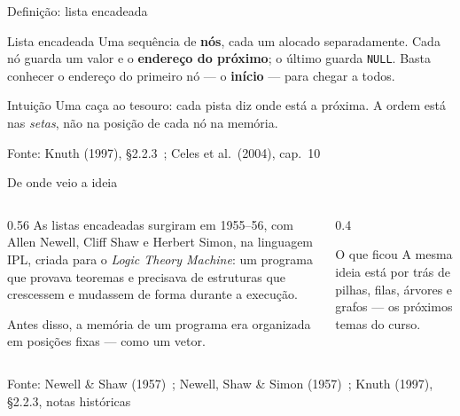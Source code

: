 \documentclass[aspectratio=169]{beamer}
\newcommand{\ptr}[1]{($(#1.one split north)!0.5!(#1.south east)$)}
\newcommand{\fonte}[1]{\vfill\hfill{\scriptsize\textcolor{UFSGray}{Fonte: #1}}}
\begin{document}
\begin{frame}{Definição: lista encadeada}
  \begin{block}{Lista encadeada}
    \small Uma sequência de \textbf{nós}, cada um alocado separadamente.
    Cada nó guarda um valor e o \textbf{endereço do próximo}; o último guarda
    \texttt{NULL}. Basta conhecer o endereço do primeiro nó --- o
    \textbf{início} --- para chegar a todos.
  \end{block}
  \begin{center}
  \end{center}
  \begin{exampleblock}{Intuição}
    \small Uma caça ao tesouro: cada pista diz onde está a próxima. A ordem
    está nas \emph{setas}, não na posição de cada nó na memória.
  \end{exampleblock}
  \fonte{Knuth (1997), §2.2.3~\cite{knuth1997art};
    Celes et al.\ (2004), cap.~10~\cite{celes2004introducao}}
\end{frame}

\begin{frame}{De onde veio a ideia}
  \begin{columns}[c]
    \begin{column}{0.56\textwidth}
      \small
      As listas encadeadas surgiram em 1955--56, com Allen Newell, Cliff
      Shaw e Herbert Simon, na linguagem IPL, criada para o
      \emph{Logic Theory Machine}: um programa que provava teoremas e
      precisava de estruturas que crescessem e mudassem de forma durante a
      execução.

      \medskip
      Antes disso, a memória de um programa era organizada em posições
      fixas --- como um vetor.
    \end{column}
    \begin{column}{0.4\textwidth}
      \begin{block}{O que ficou}
        \small A mesma ideia está por trás de pilhas, filas, árvores e
        grafos --- os próximos temas do curso.
      \end{block}
    \end{column}
  \end{columns}
  \fonte{Newell \& Shaw (1957)~\cite{newell1957programming}; Newell, Shaw \& Simon (1957)~\cite{newell1957empirical};
    Knuth (1997), §2.2.3, notas históricas~\cite{knuth1997art}}
\end{frame}
\end{document}
